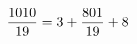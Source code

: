 \documentclass[preview]{standalone}
\begin{document}
\begin{align*}
\special{dvisvgm:raw <g id='unique000'>}\frac{1010}{19} = 3 + \frac{801}{19} + 8\special{dvisvgm:raw </g>}
\end{align*}
\end{document}
